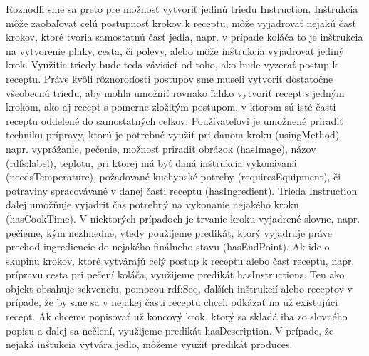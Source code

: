 	Rozhodli sme sa preto pre možnosť vytvoriť jedinú triedu Instruction. Inštrukcia môže zaobaľovať celú postupnosť krokov k receptu, môže vyjadrovať nejakú časť krokov, ktoré tvoria samostatnú časť jedla, napr. v prípade koláča to je inštrukcia na vytvorenie plnky, cesta, či polevy, alebo môže inštrukcia vyjadrovať jediný krok. Využitie triedy bude teda závisieť od toho, ako bude vyzerať postup k receptu. Práve kvôli rôznorodosti postupov sme museli vytvoriť dostatočne všeobecnú triedu, aby mohla umožniť rovnako ľahko vytvoriť recept s jedným krokom, ako aj recept s pomerne zložitým postupom, v ktorom sú isté časti receptu oddelené do samostatných celkov. Používateľovi je umožnené priradiť techniku prípravy, ktorú je potrebné využiť pri danom kroku (usingMethod), napr. vyprážanie, pečenie, možnosť priradiť obrázok (hasImage), názov (rdfs:label), teplotu, pri ktorej má byť daná inštrukcia vykonávaná (needsTemperature), požadované kuchynské potreby (requiresEquipment), či potraviny spracovávané v danej časti receptu (hasIngredient).  Trieda Instruction ďalej umožňuje vyjadriť čas potrebný na vykonanie nejakého kroku (hasCookTime). V niektorých prípadoch je trvanie kroku vyjadrené slovne, napr. pečieme, kým nezhnedne, vtedy použijeme predikát, ktorý vyjadruje práve prechod ingrediencie do nejakého finálneho stavu (hasEndPoint). Ak ide o skupinu krokov, ktoré vytvárajú celý postup k receptu alebo časť receptu, napr. prípravu cesta pri pečení koláča, využijeme predikát hasInstructions. Ten ako objekt obsahuje sekvenciu, pomocou rdf:Seq, ďalších inštrukcií alebo receptov v prípade, že by sme sa v nejakej časti receptu chceli odkázať na už existujúci recept. Ak chceme popisovať už koncový krok, ktorý sa skladá iba zo slovného popisu a ďalej sa nečlení, využijeme predikát hasDescription. V prípade, že nejaká inštukcia vytvára jedlo, môžeme využiť predikát produces.
 
